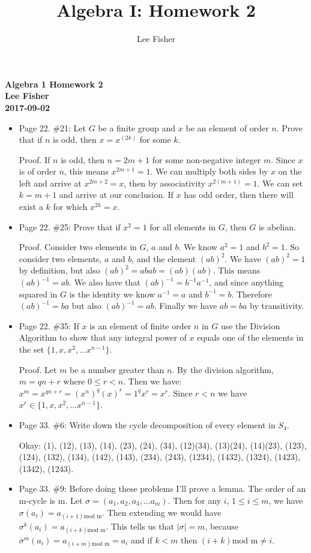 \documentclass[12pt]{report}
\title{\textbf{Algebra I: Homework 2}}
\author{Lee Fisher}
\date{}
\begin{document}
\textbf{Algebra 1 Homework 2}\\
\indent \textbf{Lee Fisher}\\
\indent \textbf{2017-09-02}

\begin{itemize}
\item Page 22. \#21: Let $G$ be a finite group and $x$ be an element of order $n$. Prove that if $n$ is odd, then
      $x = x^(2k)$ for some $k$.

      Proof. If $n$ is odd, then $n = 2m+1$ for some non-negative integer $m$. Since $x$ is of order $n$, this means
      $x^{2m+1} = 1$. We can multiply both sides by $x$ on the left and arrive at $x^{2m+2} = x$, then by associativity
      $x^{2(m+1)} = 1$. We can set $k = m+1$ and arrive at our conclusion. If $x$ has odd order, then there will exist a
      $k$ for which $x^{2k} = x$.
\
\item Page 22. \#25: Prove that if $x^2 = 1$ for all elements in $G$, then $G$ is abelian.

      Proof. Consider two elements in $G$, $a$ and $b$. We know $a^2 = 1$ and $b^2 = 1$. So consider two elements, $a$
      and $b$, and the element $(ab)^2$. We have $(ab)^2 = 1$ by definition, but also $(ab)^2 = abab = (ab)(ab)$. This
      means $(ab)^{-1} = ab$. We also have that $(ab)^{-1} = b^{-1}a^{-1}$, and since anything squared in $G$ is the
      identity we know $a^{-1} = a$ and $b^{-1} = b$. Therefore $(ab)^{-1} = ba$ but also $(ab)^{-1} = ab$. Finally we
      have $ab = ba$ by transitivity.

\item Page 22. \#35: If $x$ is an element of finite order $n$ in $G$ use the Division Algorithm to show that any integral
      power of $x$ equals one of the elements in the set $\{1,x,x^2, \dots x^{n-1}\}$.

      Proof. Let $m$ be a number greater than $n$. By the division algorithm, $m = qn + r$ where $0 \leq r < n$. Then
      we have: $x^m = x^{qn + r} = (x^n)^q(x)^r = 1^qx^r = x^r$. Since $r < n$ we have $x^r \in \{1,x,x^2,
      \dots x^{n-1}\}$.

\item Page 33. \#6: Write down the cycle decomposition of every element in $S_4$.

      Okay: (1), (12), (13), (14), (23), (24), (34), (12)(34), (13)(24), (14)(23), (123), (124), (132), (134), (142),
      (143), (234), (243), (1234), (1432), (1324), (1423), (1342), (1243).

\item Page 33. \#9: Before doing these problems I'll prove a lemma. The order of an m-cycle is m. Let
$\sigma = (a_1, a_2, a_3, \dots a_m)$. Then for any $i$, $1 \leq i \leq m$, we have
$\sigma(a_i) = a_{(i+1) \textrm{mod m}}$. Then extending we would have $\sigma^k(a_i) = a_{(i+k) \textrm{mod m}}$. This
tells us that $|\sigma| = m$, because $\sigma^m(a_i) = a_{(i+m) \textrm{mod m}} = a_i$ and if $k < m$ then
$(i+k) \textrm{mod m} \neq i$.


\end{itemize}
\end{document}
